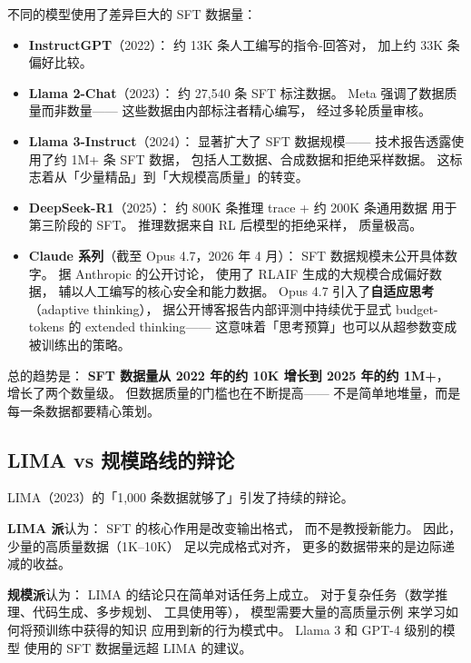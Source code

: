 不同的模型使用了差异巨大的 SFT 数据量：

\begin{itemize}[noitemsep]
  \item \textbf{InstructGPT}（2022）：
        约 13K 条人工编写的指令-回答对，
        加上约 33K 条偏好比较。
  \item \textbf{Llama 2-Chat}（2023）：
        约 27,540 条 SFT 标注数据。
        Meta 强调了数据质量而非数量——
        这些数据由内部标注者精心编写，
        经过多轮质量审核。
  \item \textbf{Llama 3-Instruct}（2024）：
        显著扩大了 SFT 数据规模——
        技术报告透露使用了约 1M+ 条 SFT 数据，
        包括人工数据、合成数据和拒绝采样数据。
        这标志着从「少量精品」到「大规模高质量」的转变。
  \item \textbf{DeepSeek-R1}（2025）：
        约 800K 条推理 trace + 约 200K 条通用数据
        用于第三阶段的 SFT。
        推理数据来自 RL 后模型的拒绝采样，
        质量极高。
  \item \textbf{Claude 系列}（截至 Opus 4.7，2026 年 4 月）：
        SFT 数据规模未公开具体数字。
        据 Anthropic 的公开讨论，
        使用了 RLAIF 生成的大规模合成偏好数据，
        辅以人工编写的核心安全和能力数据。
        Opus 4.7 引入了\textbf{自适应思考}（adaptive thinking），
        据公开博客报告内部评测中持续优于显式 budget-tokens 的 extended thinking——
        这意味着「思考预算」也可以从超参数变成被训练出的策略。
\end{itemize}

总的趋势是：
\textbf{SFT 数据量从 2022 年的约 10K 增长到 2025 年的约 1M+}，
增长了两个数量级。
但数据质量的门槛也在不断提高——
不是简单地堆量，而是每一条数据都要精心策划。

\subsection{LIMA vs 规模路线的辩论}

LIMA（2023）的「1,000 条数据就够了」引发了持续的辩论。

\textbf{LIMA 派}认为：
SFT 的核心作用是改变输出格式，
而不是教授新能力。
因此，少量的高质量数据（1K--10K）
足以完成格式对齐，
更多的数据带来的是边际递减的收益。

\textbf{规模派}认为：
LIMA 的结论只在简单对话任务上成立。
对于复杂任务（数学推理、代码生成、多步规划、
工具使用等），
模型需要大量的高质量示例
来学习如何将预训练中获得的知识
应用到新的行为模式中。
Llama 3 和 GPT-4 级别的模型
使用的 SFT 数据量远超 LIMA 的建议。

